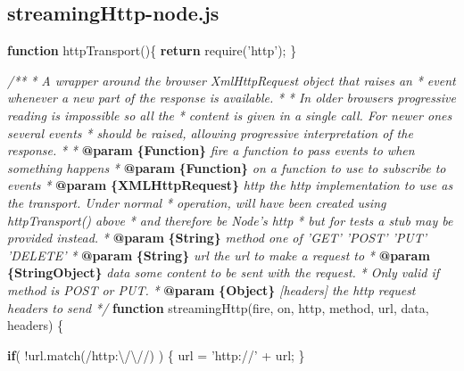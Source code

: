 \documentclass[]{article}
\newenvironment{Shaded}{}{}
\newcommand{\KeywordTok}[1]{\textcolor[rgb]{0.00,0.44,0.13}{\textbf{{#1}}}}
\newcommand{\FloatTok}[1]{\textcolor[rgb]{0.25,0.63,0.44}{{#1}}}
\newcommand{\StringTok}[1]{\textcolor[rgb]{0.25,0.44,0.63}{{#1}}}
\newcommand{\CommentTok}[1]{\textcolor[rgb]{0.38,0.63,0.69}{\textit{{#1}}}}
\newcommand{\OtherTok}[1]{\textcolor[rgb]{0.00,0.44,0.13}{{#1}}}
\newcommand{\FunctionTok}[1]{\textcolor[rgb]{0.02,0.16,0.49}{{#1}}}
\newcommand{\NormalTok}[1]{{#1}}
\begin{document}
\pagebreak

\subsection{streamingHttp-node.js}

\begin{Shaded}
\begin{Highlighting}[]
\KeywordTok{function} \FunctionTok{httpTransport}\NormalTok{()\{}
   \KeywordTok{return} \FunctionTok{require}\NormalTok{(}\StringTok{'http'}\NormalTok{);}
\NormalTok{\}}

\CommentTok{/**}
\CommentTok{ * A wrapper around the browser XmlHttpRequest object that raises an }
\CommentTok{ * event whenever a new part of the response is available.}
\CommentTok{ * }
\CommentTok{ * In older browsers progressive reading is impossible so all the }
\CommentTok{ * content is given in a single call. For newer ones several events}
\CommentTok{ * should be raised, allowing progressive interpretation of the response.}
\CommentTok{ *      }
\CommentTok{ * }\KeywordTok{@param}\CommentTok{ }\KeywordTok{\{Function\}}\CommentTok{ fire a function to pass events to when something happens}
\CommentTok{ * }\KeywordTok{@param}\CommentTok{ }\KeywordTok{\{Function\}}\CommentTok{ on a function to use to subscribe to events}
\CommentTok{ * }\KeywordTok{@param}\CommentTok{ }\KeywordTok{\{XMLHttpRequest\}}\CommentTok{ http the http implementation to use as the transport. Under normal}
\CommentTok{ *          operation, will have been created using httpTransport() above}
\CommentTok{ *          and therefore be Node's http}
\CommentTok{ *          but for tests a stub may be provided instead.}
\CommentTok{ * }\KeywordTok{@param}\CommentTok{ }\KeywordTok{\{String\}}\CommentTok{ method one of 'GET' 'POST' 'PUT' 'DELETE'}
\CommentTok{ * }\KeywordTok{@param}\CommentTok{ }\KeywordTok{\{String\}}\CommentTok{ url the url to make a request to}
\CommentTok{ * }\KeywordTok{@param}\CommentTok{ }\KeywordTok{\{String\textbar{}Object\}}\CommentTok{ data some content to be sent with the request.}
\CommentTok{ *                        Only valid if method is POST or PUT.}
\CommentTok{ * }\KeywordTok{@param}\CommentTok{ }\KeywordTok{\{Object\}}\CommentTok{ [headers] the http request headers to send                       }
\CommentTok{ */}  
\KeywordTok{function} \FunctionTok{streamingHttp}\NormalTok{(fire, on, http, method, url, data, headers) \{}
                        
   \KeywordTok{if}\NormalTok{( !}\OtherTok{url}\NormalTok{.}\FunctionTok{match}\NormalTok{(}\OtherTok{/http:}\FloatTok{\textbackslash{}/\textbackslash{}/}\OtherTok{/}\NormalTok{) ) \{}
      \NormalTok{url = }\StringTok{'http://'} \NormalTok{+ url;}
   \NormalTok{\}                           }
                        

\end{Highlighting}
\end{Shaded}
\end{document}
